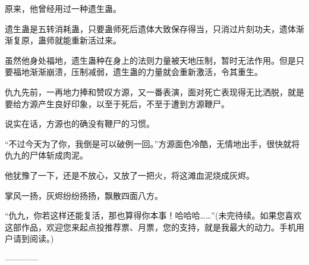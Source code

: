 \begin{this_body}
原来，他曾经用过一种遗生蛊。

遗生蛊是五转消耗蛊，只要蛊师死后遗体大致保存得当，只消过片刻功夫，遗体渐渐复原，蛊师就能重新活过来。

虽然他身处福地，遗生蛊种在身上的法则力量被天地压制，暂时无法作用。但是只要福地渐渐崩溃，压制减弱，遗生蛊的力量就会重新激活，令其重生。

仇九先前，一再地力捧和赞叹方源，又一番表演，面对死亡表现得无比洒脱，就是要给方源产生良好印象，以至于死后，不至于遭到方源鞭尸。

说实在话，方源也的确没有鞭尸的习惯。

“不过今天为了你，我倒是可以破例一回。”方源面色冷酷，无情地出手，很快就将仇九的尸体斩成肉泥。

他犹豫了一下，还是不放心，又放了一把火，将这滩血泥烧成灰烬。

掌风一扬，灰烬纷纷扬扬，飘散四面八方。

“仇九，你若这样还能复活，那也算得你本事！哈哈哈……”(未完待续。如果您喜欢这部作品，欢迎您来起点投推荐票、月票，您的支持，就是我最大的动力。手机用户请到阅读。)

------------

\end{this_body}

